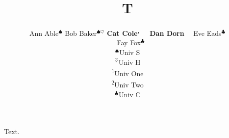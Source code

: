 \documentclass{article}
\title{T}
\author{Ann Able$^\spadesuit$ \: \: Bob Baker$^{\spadesuit\heartsuit}$ \: \:
\textbf{Cat Cole\textsuperscript{\normalfont{1},}}\ \ \ \textbf{Dan Dorn\textsuperscript{\normalfont{2}}} \ \
Eve Eads$^\clubsuit$

\ \ Fay Fox$^\clubsuit$\\
$^\spadesuit$Univ S \\ $^\heartsuit$Univ H \\ \textsuperscript{1}Univ One \\ \textsuperscript{2}Univ Two \\
$^\clubsuit$Univ C}
\begin{document}
\maketitle
Text.
\end{document}
